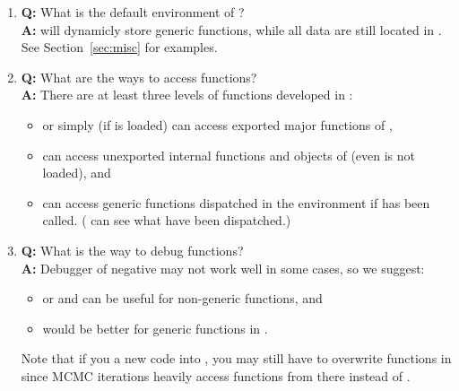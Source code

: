 \begin{enumerate}
\item {\bf\color{blue} Q:}
      What is the default environment of ? \\
      {\bf\color{blue} A:}
       will dynamicly store generic functions, while
      all data are still located in .
      See Section~\ref{sec:misc} for examples.

\item {\bf\color{blue} Q:}
      What are the ways to access  functions? \\
      {\bf\color{blue} A:}
      There are at least three levels of functions developed in :
      \begin{itemize}
        \item {} or simply 
              (if  is loaded) can access exported major functions
              of ,
        \item {}
              can access unexported internal functions and objects
              of  (even  is not loaded), and
        \item {}
              can access generic functions dispatched in the environment
               if  has been called.
              ( can see what have been dispatched.)
      \end{itemize}

\item {\bf\color{blue} Q:}
      What is the way to debug  functions? \\
      {\bf\color{blue} A:}
      Debugger of negative  may not work well in some cases, so we
      suggest:
      \begin{itemize}
        \item {} or  and 
              can be useful for non-generic functions, and
        \item {} would be better for generic functions
              in .
      \end{itemize}
      Note that if you  a new code into , you
      may still have to overwrite functions in  since
      MCMC iterations heavily access functions from there instead of
      .

\end{enumerate}

